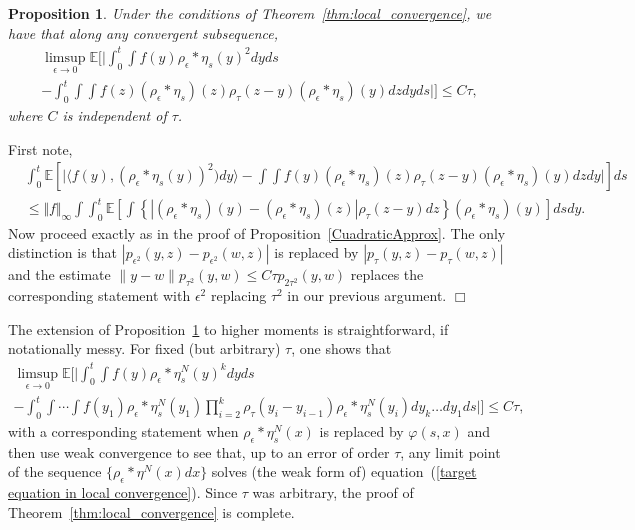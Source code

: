 \documentclass[12pt]{article}
\newenvironment {proof}{{\noindent\bf Proof }}{\hfill $\Box$ \medskip}
\newtheorem{proposition}[theorem]{Proposition}
\newcommand{\IE}{\mathbb E}
\numberwithin{equation}{section}
\begin{document}
\begin{proposition}
	\label{quadratic convergence}
Under the conditions of Theorem~\ref{thm:local_convergence}, we have that
along any convergent subsequence,
\begin{multline}
\label{approx4}
\limsup_{\epsilon \to 0}
\IE\Big[\Big|
\int_0^t\int f(y) \rho_\epsilon*\eta_s(y)^2 dy ds
\\
-
\int_0^t\int \int f(z) (\rho_\epsilon * \eta_s)(z) 
\rho_\tau (z-y) (\rho_\epsilon * \eta_s)(y) dz dy ds\Big|\Big]\leq C\tau,
\end{multline}
where $C$ is independent of $\tau$.
\end{proposition}
\begin{proof}
First note,
\begin{align}
&\int_0^t 
\mathbb{E}\left[\big| \langle f(y), (\rho_\epsilon*\eta_s(y))^2) dy \rangle 
- \int \int f(y) (\rho_\epsilon * \eta_s)(z) \rho_\tau (z-y) 
(\rho_\epsilon * \eta_s)(y) dz dy \big|\right] ds 
\nonumber 
\\ 
&\leq  
\Vert f \Vert_\infty \int  \int_0^t  
\mathbb{E}\left[ \int \left\{ \left|(\rho_\epsilon * \eta_s)(y)
-(\rho_\epsilon * \eta_s)(z) \right|   \rho_\tau(z-y) dz \right\} 
(\rho_\epsilon *\eta_s)(y) \right] ds  dy. 
\label{b1}
\end{align}
Now proceed exactly as in the proof of 
Proposition~\ref{CuadraticApprox}.
The only distinction is that $|p_{\epsilon^2}(y,z)-p_{\epsilon^2}(w,z)|$
is replaced by $|p_{\tau}(y,z)-p_{\tau}(w,z)|$ and 
the estimate $\|y-w\|p_{\tau^2}(y,w)\leq C\tau p_{2\tau^2}(y,w)$
replaces the corresponding statement with $\epsilon^2$ replacing 
$\tau^2$ in our previous argument.
\end{proof}

The extension of Proposition~\ref{quadratic convergence}
to higher moments is straightforward, if notationally messy. For 
fixed (but arbitrary) $\tau$, one shows that
\begin{multline*}
	\limsup_{\epsilon\to 0}
	\IE\Big[\Big|
	\int_0^t\int f(y)\rho_\epsilon*\eta_s^N(y)^k dy ds
\\
	- \int_0^t\int\cdots\int f(y_1)
	\rho_\epsilon*\eta_s^N(y_1) 
\prod_{i=2}^{k}\rho_\tau (y_i-y_{i-1})\rho_\epsilon*\eta_s^N(y_i)
dy_{k}\ldots dy_1 ds\Big| \Big]
	\leq C\tau,
\end{multline*}
with a corresponding statement when $\rho_\epsilon*\eta_s^N(x)$ is replaced
by $\varphi(s,x)$ and then use weak convergence to see that, up to an error 
of order $\tau$, any limit point of
the sequence $\{\rho_\epsilon*\eta^N(x)dx\}$ solves (the weak form 
of) equation~(\ref{target equation in local convergence}).
Since $\tau$ was arbitrary, the proof of Theorem~\ref{thm:local_convergence}
is complete.
\end{document}
